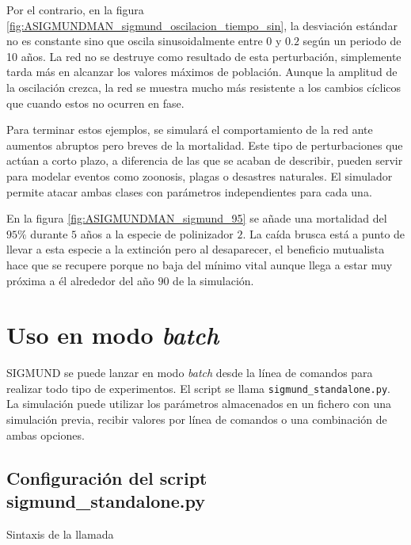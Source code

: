 Por el contrario, en la figura \ref{fig:ASIGMUNDMAN_sigmund_oscilacion_tiempo_sin}, la desviación estándar no es constante sino que oscila sinusoidalmente entre $0$ y $0.2$ según un periodo de 10 años. La red no se destruye como resultado de esta perturbación, simplemente tarda más en alcanzar los valores máximos de población. Aunque la amplitud de la oscilación crezca, la red se muestra mucho más resistente a los cambios cíclicos que cuando estos no ocurren en fase.

Para terminar estos ejemplos, se simulará el comportamiento de la red ante aumentos abruptos pero breves de la mortalidad. Este tipo de perturbaciones que actúan a corto plazo, a diferencia de las que se acaban de describir, pueden servir para modelar eventos como zoonosis, plagas o desastres naturales. El simulador permite atacar ambas clases con parámetros independientes para cada una.

En la figura \ref{fig:ASIGMUNDMAN_sigmund_95} se añade una mortalidad del $95\%$ durante $5$ años a la especie de polinizador $2$. La caída brusca está a punto de llevar a esta especie a la extinción pero al desaparecer, el beneficio mutualista hace que se recupere porque no baja del mínimo vital aunque llega a estar muy próxima a él alrededor del año $90$ de la simulación.

\section{Uso en modo \textit{batch}}

SIGMUND se puede lanzar en modo \textit{batch} desde la línea de comandos para realizar todo tipo de experimentos. El script se llama \texttt{sigmund\_standalone.py}. La simulación puede utilizar los parámetros almacenados en un fichero con una simulación previa, recibir
valores por línea de comandos o una combinación de ambas opciones.

\subsection{Configuración del script sigmund\_standalone.py}

\noindent Sintaxis de la llamada


